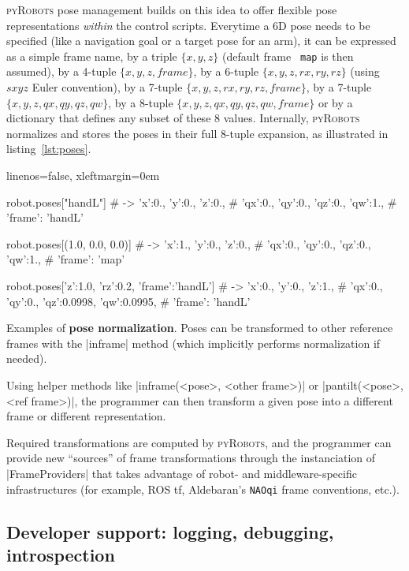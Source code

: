 \documentclass[a4paper, 10pt, conference]{ieeeconf}      %
\newcommand{\pyRobots}{\textsc{pyRobots}}
\begin{document}
\pyRobots{} pose management builds on this idea to offer flexible pose
representations \emph{within} the control scripts. Everytime a 6D pose needs to
be specified (like a navigation goal or a target pose for an arm), it can be
expressed as a simple frame name, by a triple $\{x, y, z\}$ (default frame {\tt
map} is then assumed), by a 4-tuple $\{x, y, z, frame\}$, by a 6-tuple $\{x, y,
z, rx, ry, rz\}$ (using $sxyz$ Euler convention), by a 7-tuple $\{x, y, z, rx,
ry, rz, frame\}$, by a 7-tuple $\{x, y, z, qx, qy, qz, qw\}$, by a 8-tuple $\{x,
y, z, qx, qy, qz, qw, frame\}$ or by a dictionary that defines any subset of
these 8 values.  Internally, \pyRobots{} normalizes and stores the poses in
their full 8-tuple expansion, as illustrated in listing~\ref{lst:poses}.

\begin{listing}
    \begin{pythoncode*}{linenos=false, xleftmargin=0em}

    robot.poses["handL"]
    # -> {'x':0., 'y':0., 'z':0., 
    #    'qx':0., 'qy':0., 'qz':0., 'qw':1., 
    #    'frame': 'handL'}

    robot.poses[(1.0, 0.0, 0.0)]
    # -> {'x':1., 'y':0., 'z':0., 
    #    'qx':0., 'qy':0., 'qz':0., 'qw':1., 
    #    'frame': 'map'}

    robot.poses[{'z':1.0, 'rz':0.2, 'frame':'handL'}]
    # -> {'x':0., 'y':0., 'z':1., 
    #    'qx':0., 'qy':0., 'qz':0.0998, 'qw':0.0995, 
    #    'frame': 'handL'}

\end{pythoncode*}
\caption{Examples of \textbf{pose normalization}. Poses can be transformed to
other reference frames with the \python|inframe| method (which implicitly performs
normalization if needed).}
\label{lst:poses}
\end{listing}

Using helper methods like \python|inframe(<pose>, <other frame>)| or
\python|pantilt(<pose>, <ref frame>)|, the programmer can then
transform a given pose into a different frame or different representation.

Required transformations are computed by \pyRobots{}, and the programmer can
provide new ``sources'' of frame transformations through the instanciation of
\python|FrameProviders| that takes advantage of robot- and middleware-specific
infrastructures (for example, ROS {\sc tf}, Aldebaran's {\tt NAOqi} frame
conventions, etc.).

\subsection{Developer support: logging, debugging, introspection}
\label{}
\end{document}
